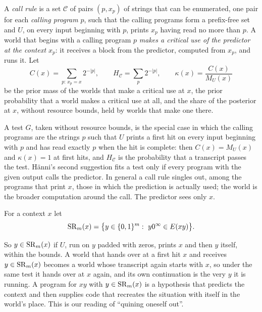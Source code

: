 \begin{definition}\label{def:call}
A \emph{call rule} is a set $\mathcal C$ of pairs $(p,x_p)$ of strings that can be enumerated, one pair for
each \emph{calling program} $p$, such that the calling programs form a prefix-free set and $U$, on every input
beginning with $p$, prints $x_p$ having read no more than $p$. A world that begins with a calling program
$p$ \emph{makes a critical use of the
predictor at the context $x_p$}: it receives a block from the predictor, computed from $x_p$, and runs it. Let
\[
C(x)=\sum_{p:\,x_p=x}2^{-|p|},\qquad H_{\mathcal C}=\sum_{p}2^{-|p|},\qquad \kappa(x)=\frac{C(x)}{M_U(x)}
\]
be the prior mass of the worlds that make a critical use at $x$, the prior probability that a world makes a
critical use at all, and the share of the posterior at $x$, without resource bounds, held by worlds that make
one there.
\end{definition}

A test $G$, taken without resource bounds, is the special case in which the calling programs are the strings
$p$ such that $U$ prints a first hit on every input beginning with $p$ and has read exactly $p$ when the hit
is complete: then $C(x)=M_U(x)$ and $\kappa(x)=1$ at first hits, and $H_{\mathcal C}$ is the probability
that a
transcript passes the test. H\"anni's second suggestion fits a test only if every program with the given
output calls the predictor. In general a call rule singles out, among the programs that print $x$, those in
which the
prediction is actually used; the world is the broader computation around the call. The predictor sees only
$x$.

\begin{definition}\label{def:sr}
For a context $x$ let
\[
\mathrm{SR}_m(x)=\bigl\{y\in\{0,1\}^m:\ y0^\infty\in E(xy)\bigr\}.
\]
\end{definition}

So $y\in\mathrm{SR}_m(x)$ if $U$, run on $y$ padded with zeros, prints $x$ and then $y$ itself, within the bounds.
A world that hands over at a first hit $x$ and receives $y\in\mathrm{SR}_m(x)$ becomes a world whose transcript again
starts with $x$, so under the same test it hands over at $x$ again, and its own continuation is the very $y$
it is running.
A program for $xy$ with $y\in\mathrm{SR}_m(x)$ is a hypothesis that predicts the context and then supplies code that
recreates the situation with itself in the world's place. This is our reading of ``quining oneself out''.

